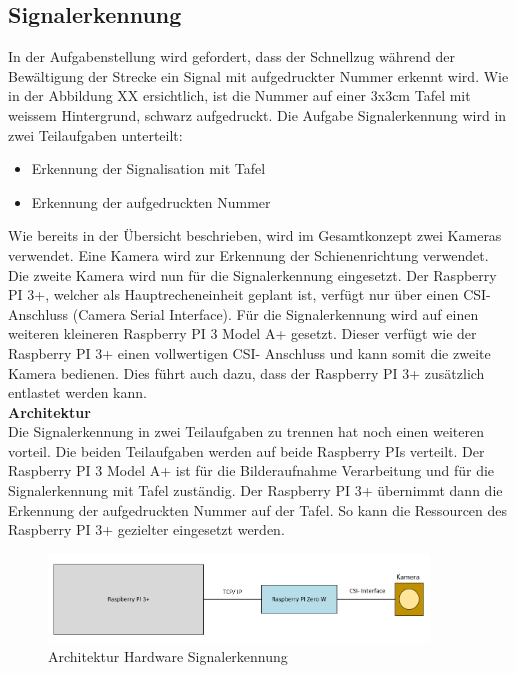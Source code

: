\documentclass[../../main.tex]{subfiles}
\begin{document}
\subsection{Signalerkennung}
    In der Aufgabenstellung wird gefordert, dass der Schnellzug während der Bewältigung der Strecke ein Signal mit aufgedruckter Nummer erkennt wird. Wie in der Abbildung XX ersichtlich, ist die Nummer auf einer 3x3cm Tafel mit weissem Hintergrund, schwarz aufgedruckt. Die Aufgabe Signalerkennung wird in zwei Teilaufgaben unterteilt:
    \begin{itemize}
        \item Erkennung der Signalisation mit Tafel
        \item Erkennung der aufgedruckten Nummer
    \end{itemize}
    Wie bereits in der Übersicht beschrieben, wird im Gesamtkonzept zwei Kameras verwendet. Eine Kamera wird zur Erkennung der Schienenrichtung verwendet. Die zweite Kamera wird nun für die Signalerkennung eingesetzt. Der Raspberry PI 3+, welcher als Hauptrecheneinheit geplant ist, verfügt nur über einen CSI- Anschluss (Camera Serial Interface). Für die Signalerkennung wird auf einen weiteren kleineren Raspberry PI 3 Model A+ gesetzt. Dieser verfügt wie der Raspberry PI 3+ einen vollwertigen CSI- Anschluss und kann somit die zweite Kamera bedienen. Dies führt auch dazu, dass der Raspberry PI 3+ zusätzlich entlastet werden kann.\\

    \textbf{Architektur}\\
    Die Signalerkennung in zwei Teilaufgaben zu trennen hat noch einen weiteren vorteil. Die beiden Teilaufgaben werden auf beide Raspberry PIs verteilt. Der Raspberry PI 3 Model A+ ist für die Bilderaufnahme Verarbeitung und für die Signalerkennung mit Tafel zuständig. Der Raspberry PI 3+ übernimmt dann die Erkennung der aufgedruckten Nummer auf der Tafel. So kann die Ressourcen des Raspberry PI 3+ gezielter eingesetzt werden.

    \begin{figure}[H] %
        \centering
        \includegraphics[width=0.9\textwidth]{Architektur.png}
        \caption{Architektur Hardware Signalerkennung}
        \label{fig:architektur_hardware_signalerkennung}
    \end{figure}
\end{document}
